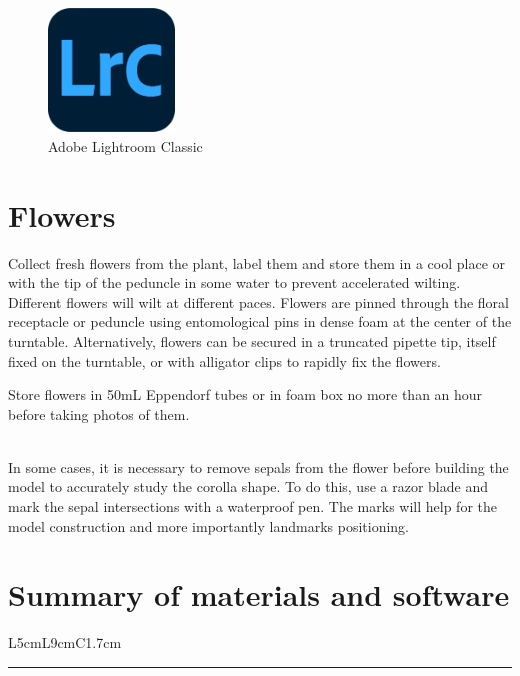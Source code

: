 \documentclass[
]{book}
\theoremstyle{definition}
\theoremstyle{definition}
\theoremstyle{definition}
\theoremstyle{definition}
\theoremstyle{remark}
\begin{document}
\begin{figure}
\centering
\includegraphics[width=0.3\textwidth,height=\textheight]{Figures/logo Lrc.png}
\caption{Adobe Lightroom Classic}
\end{figure}

\hypertarget{flowers}{%
\section{Flowers}\label{flowers}}

Collect fresh flowers from the plant, label them and store them in a
cool place or with the tip of the peduncle in some water to prevent
accelerated wilting. Different flowers will wilt at different paces.
Flowers are pinned through the floral receptacle or peduncle using
entomological pins in dense foam at the center of the turntable.
Alternatively, flowers can be secured in a truncated pipette tip, itself
fixed on the turntable, or with alligator clips to rapidly fix the
flowers.

Store flowers in 50mL Eppendorf tubes or in foam box no more than an
hour before taking photos of them.\\
\strut \\
In some cases, it is necessary to remove sepals from the flower before
building the model to accurately study the corolla shape. To do this,
use a razor blade and mark the sepal intersections with a waterproof
pen. The marks will help for the model construction and more importantly
landmarks positioning.

\hypertarget{summary-of-materials-and-software}{%
\section{Summary of materials and software}\label{summary-of-materials-and-software}}

L5cm\textbar L9cm\textbar C1.7cm

\begin{center}\rule{0.5\linewidth}{0.5pt}\end{center}
\end{document}
